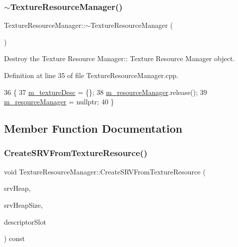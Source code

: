 \subsubsection{\texorpdfstring{$\sim$\+Texture\+Resource\+Manager()}{~TextureResourceManager()}}
{\footnotesize\ttfamily Texture\+Resource\+Manager\+::$\sim$\+Texture\+Resource\+Manager (\begin{DoxyParamCaption}{ }\end{DoxyParamCaption})}



Destroy the Texture Resource Manager\+:\+: Texture Resource Manager object. 



Definition at line 35 of file Texture\+Resource\+Manager.\+cpp.


\begin{DoxyCode}
36 \{
37     \mbox{\hyperlink{class_texture_resource_manager_a9137a54de5e1a26cf0bb3d37b6b1af93}{m\_textureDesc}} = \{\};
38     \mbox{\hyperlink{class_texture_resource_manager_a789f95efcad1717efd90f7e6ec1ee0ea}{m\_resourceManager}}.release();
39     \mbox{\hyperlink{class_texture_resource_manager_a789f95efcad1717efd90f7e6ec1ee0ea}{m\_resourceManager}} = \textcolor{keyword}{nullptr};
40 \}
\end{DoxyCode}


\subsection{Member Function Documentation}
\mbox{\label{class_texture_resource_manager_ad7d780da205f6144058a3ba1882ad5de}} 
\subsubsection{\texorpdfstring{Create\+S\+R\+V\+From\+Texture\+Resource()}{CreateSRVFromTextureResource()}}
{\footnotesize\ttfamily void Texture\+Resource\+Manager\+::\+Create\+S\+R\+V\+From\+Texture\+Resource (\begin{DoxyParamCaption}\item[{Microsoft\+::\+W\+R\+L\+::\+Com\+Ptr$<$ I\+D3\+D12\+Descriptor\+Heap $>$}]{srv\+Heap,  }\item[{const U\+I\+NT}]{srv\+Heap\+Size,  }\item[{const int}]{descriptor\+Slot }\end{DoxyParamCaption}) const}



